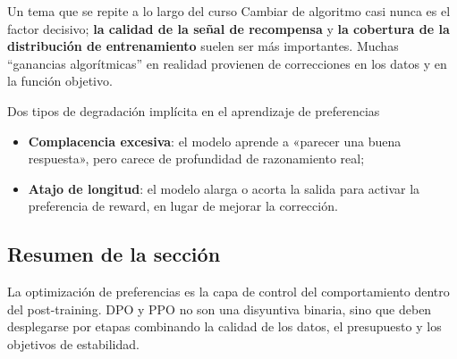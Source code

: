 \begin{knowledgebox}{Un tema que se repite a lo largo del curso}
Cambiar de algoritmo casi nunca es el factor decisivo; \textbf{la calidad de la señal de recompensa} y \textbf{la cobertura de la distribución de entrenamiento} suelen ser más importantes. Muchas ``ganancias algorítmicas'' en realidad provienen de correcciones en los datos y en la función objetivo.
\end{knowledgebox}

\begin{warningbox}{Dos tipos de degradación implícita en el aprendizaje de preferencias}
\begin{itemize}
    \item \textbf{Complacencia excesiva}: el modelo aprende a «parecer una buena respuesta», pero carece de profundidad de razonamiento real;
    \item \textbf{Atajo de longitud}: el modelo alarga o acorta la salida para activar la preferencia de reward, en lugar de mejorar la corrección.
\end{itemize}
\end{warningbox}

\subsection{Resumen de la sección}
La optimización de preferencias es la capa de control del comportamiento dentro del post-training. DPO y PPO no son una disyuntiva binaria, sino que deben desplegarse por etapas combinando la calidad de los datos, el presupuesto y los objetivos de estabilidad.

